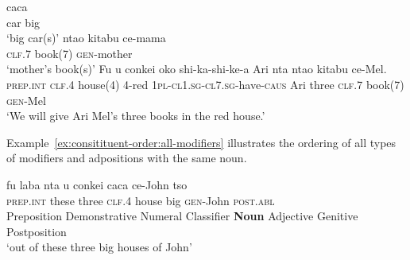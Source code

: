 \begin{exe}
\ex
{} caca \\
car big \\
\trans `big car(s)'
\ex
\gll nta\textbeltl o kitabu ce-mama \\
\textsc{clf.7} book(7) \textsc{gen}-mother \\
\trans `mother's book(s)'
\ex
\gll Fu u conkei \textbeltl oko shi-ka-shi-ke-\textbeltl a Ari nta nta\textbeltl o kitabu ce-Mel. \\
\textsc{prep.int} \textsc{clf.4} house(4) 4-red \textsc{1pl}-\textsc{cl1.sg}-\textsc{cl7.sg}-have-\textsc{caus} Ari three \textsc{clf}.7 book(7) \textsc{gen}-Mel \\
\trans `We will give Ari Mel's three books in the red house.'
\end{exe}

Example~\ref{ex:consitituent-order:all-modifiers} illustrates the ordering of all types of modifiers and adpositions with the same noun.

\begin{exe}
\ex
\glll fu laba nta u conkei caca ce-John tso \\
\textsc{prep.int} these three \textsc{clf.4} house big \textsc{gen}-John \textsc{post.abl} \\
Preposition Demonstrative Numeral Classifier \textbf{Noun} Adjective Genitive Postposition \\
\trans `out of these three big houses of John'
\label{ex:consitituent-order:all-modifiers}
\end{exe}